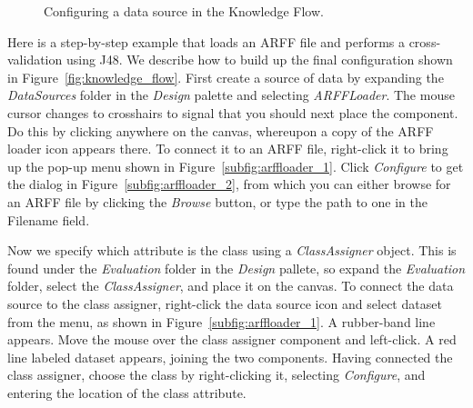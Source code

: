 \begin{figure}[!th]
\centering
{}
\qquad
{}
\caption{\label{fig:kf_arffloader}Configuring a data source in the Knowledge Flow.}
\end{figure}

Here is a step-by-step example that loads an ARFF file and performs a
cross-validation using J48. We describe how to build up the final
configuration shown in Figure~\ref{fig:knowledge_flow}. First create a
source of data by expanding the \textit{DataSources} folder in
the \textit{Design} palette and selecting \textit{ARFFLoader}. The
mouse cursor changes to crosshairs to signal that you should next
place the component. Do this by clicking anywhere on the canvas,
whereupon a copy of the ARFF loader icon appears there. To connect it
to an ARFF file, right-click it to bring up the pop-up menu shown in
Figure~\ref{subfig:arffloader_1}. Click \textit{Configure} to get the
dialog in Figure~\ref{subfig:arffloader_2}, from which you can either
browse for an ARFF file by clicking the \textit{Browse} button, or
type the path to one in the Filename field.

Now we specify which attribute is the class using
a \textit{ClassAssigner} object. This is found under
the \textit{Evaluation} folder in the \textit{Design} pallete, so
expand the \textit{Evaluation} folder, select
the \textit{ClassAssigner}, and place it on the canvas. To connect the
data source to the class assigner, right-click the data source icon
and select dataset from the menu, as shown in
Figure~\ref{subfig:arffloader_1}. A rubber-band line appears. Move the
mouse over the class assigner component and left-click. A red line
labeled dataset appears, joining the two components. Having connected
the class assigner, choose the class by right-clicking it, selecting
\textit{Configure}, and entering the location of the class attribute.

